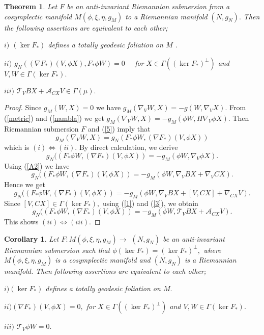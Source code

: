 \documentclass{amsart}
\newtheorem{theorem}{Theorem}
\theoremstyle{plain}
\newtheorem{corollary}{Corollary}
\numberwithin{equation}{section}
\begin{document}
\begin{theorem}
Let $F$ be an anti-invariant Riemannian submersion from a cosymplectic
manifold $M(\phi ,\xi ,\eta ,g_{M})$ to a Riemannian manifold $(N,g_{N}).$
Then the following assertions are equivalent to each other;

$i)$ $(\ker F_{\ast })$ defines a totally geodesic foliation on $M$ .

$ii)$ $g_{N}((\nabla F_{\ast })(V,\phi X),F_{\ast }\phi W)=0$ \ \ for $X\in
\Gamma ((\ker F_{\ast })^{\bot })$ and $V,W\in \Gamma (\ker F_{\ast }).$

$iii)$ $\mathcal{T}_{V}BX+\mathcal{A}_{CX}V\in \Gamma (\mu ).$
\end{theorem}

\begin{proof}
Since $g_{M}(W,X)=0$ we have $g_{M}(\nabla _{V}W,X)=-g(W,\nabla _{V}X).$
From (\ref{metric}) and (\ref{nambla}) we get $g_{M}(\nabla
_{V}W,X)=-g_{M}(\phi W,H\nabla _{V}\phi X).$ Then Riemannian submersion $F$
and (\ref{5}) imply that 
\begin{equation*}
g_{M}(\nabla _{V}W,X)=g_{N}(F_{\ast }\phi W,(\nabla F_{\ast })(V,\phi X))
\end{equation*}which is $(i)\Leftrightarrow (ii).$ By direct calculation, we derive\begin{equation*}
g_{N}((F_{\ast }\phi W,(\nabla F_{\ast })(V,\phi X))=-g_{M}(\phi W,\nabla
_{V}\phi X).
\end{equation*}Using (\ref{A2}) we have 
\begin{equation*}
g_{N}((F_{\ast }\phi W,(\nabla F_{\ast })(V,\phi X))=-g_{M}(\phi W,\nabla
_{V}BX+\nabla _{V}CX).
\end{equation*}Hence we get\begin{equation*}
g_{N}((F_{\ast }\phi W,(\nabla F_{\ast })(V,\phi X))=-g_{M}(\phi W,\nabla
_{V}BX+\left[ V,CX\right] +\nabla _{CX}V).
\end{equation*}Since $\left[ V,CX\right] \in \Gamma (\ker F_{\ast }),$ using (\ref{1}) and (\ref{3}), we obtain\begin{equation*}
g_{N}((F_{\ast }\phi W,(\nabla F_{\ast })(V,\phi X))=-g_{M}(\phi W,\mathcal{T}_{V}BX+\mathcal{A}_{CX}V).
\end{equation*}This shows $(ii)\Leftrightarrow (iii).$
\end{proof}

\begin{corollary}
Let $F:M(\phi ,\xi ,\eta ,g_{M})\rightarrow $ $(N,g_{N})$ be an
anti-invariant Riemannian submersion such that $\phi (\ker F_{\ast })=(\ker
F_{\ast })^{\bot },$ where $M(\phi ,\xi ,\eta ,g_{M})$ is a cosymplectic
manifold and $(N,g_{N})$ is a Riemannian manifold. Then following assertions
are equivalent to each other;

$i)(\ker F_{\ast })$ \textit{defines a totally geodesic foliation on }$M.$

$ii)(\nabla F_{\ast })(V,\phi X)=0,$ for $X\in \Gamma ((\ker F_{\ast
})^{\bot })$ and $V,W\in \Gamma (\ker F_{\ast }).$

$iii)$ $\mathcal{T}_{V}\phi W=0.$
\end{corollary}
\end{document}
